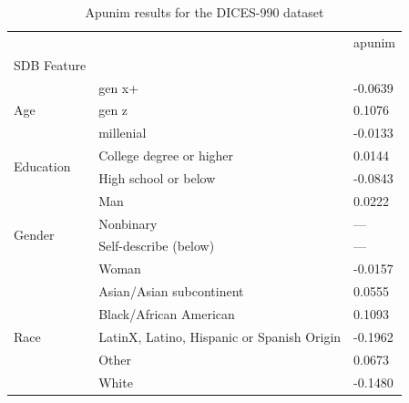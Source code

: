 \begin{table}[t]
\caption{Apunim results for the DICES-990 dataset}
\label{tab:kumar_apunim_only}
\begin{tabular}{lll}
\toprule
 &  & apunim \\
SDB Feature &  &  \\
\midrule
\multirow[t]{3}{*}{Age} & gen x+ & -0.0639 \\
 & gen z & 0.1076 \\
 & millenial & -0.0133 \\
\cline{1-3}
\multirow[t]{2}{*}{Education} & College degree or higher & 0.0144 \\
 & High school or below & -0.0843 \\
\cline{1-3}
\multirow[t]{4}{*}{Gender} & Man & 0.0222 \\
 & Nonbinary & --- \\
 & Self-describe (below) & --- \\
 & Woman & -0.0157 \\
\cline{1-3}
\multirow[t]{5}{*}{Race} & Asian/Asian subcontinent & 0.0555 \\
 & Black/African American & 0.1093 \\
 & LatinX, Latino, Hispanic or Spanish Origin & -0.1962 \\
 & Other & 0.0673 \\
 & White & -0.1480 \\
\cline{1-3}
\bottomrule
\end{tabular}
\end{table}
